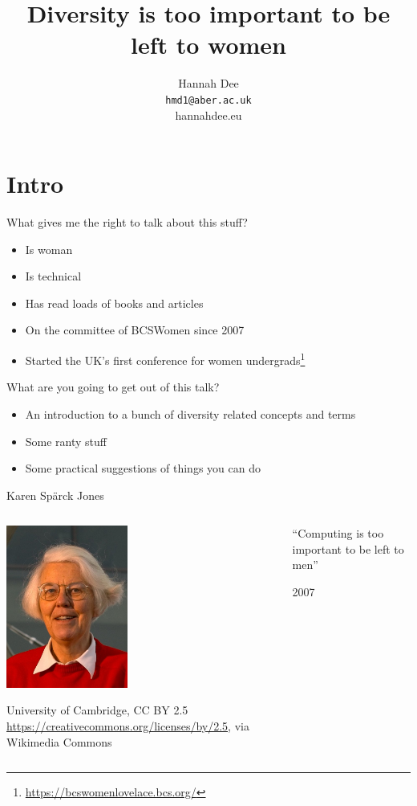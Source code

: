 \documentclass[xcolor=table,aspectratio=169]{beamer}
\title{Diversity is too important to be left to women}
\author[hmd1]{Hannah Dee \\
  \texttt{hmd1@aber.ac.uk} \\hannahdee.eu}
\date{}
\institute[]{ACCU 2022,  April 7
  Computer Science, Aberystwyth University\\BCSWomen }
\begin{document}
\begin{frame}
  \titlepage
\end{frame}


\section{Intro}

\begin{frame}{What gives me the right to talk about this stuff?}
	\begin{itemize}
		\item Is woman
		\item Is technical
		\item Has read loads of books and articles
		\item On the committee of BCSWomen since 2007
		\item Started the UK's first conference for women undergrads\footnote{\url{https://bcswomenlovelace.bcs.org/}}
	\end{itemize}
\end{frame}
\begin{frame}{What are you going to get out of this talk?}
	\begin{itemize}
		\item An introduction to a bunch of diversity related concepts and terms
		\item Some ranty stuff
		\item Some practical suggestions of things you can do
	\end{itemize}
\end{frame}

\begin{frame}{Karen Sp\"{a}rck Jones} 
	\begin{columns}
		\begin{column}{0.4\textwidth}

	\includegraphics[width=4cm]{figs/ksj.jpg}

	\tiny{University of Cambridge, CC BY 2.5 \url{https://creativecommons.org/licenses/by/2.5}, via Wikimedia Commons}

		\end{column}
		\begin{column}{0.6\textwidth}

		``Computing is too important to be left to men''

			\vspace{0.5em}

			2007
		\end{column}
		\end{columns}
\end{frame}
\end{document}
